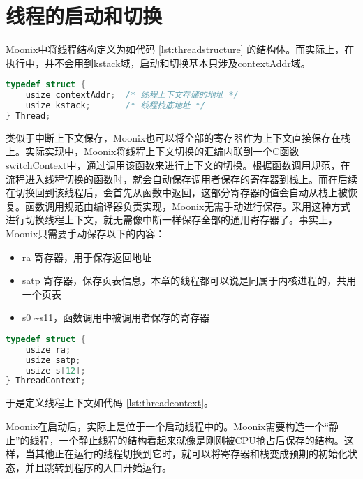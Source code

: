 \section{线程的启动和切换}

Moonix中将线程结构定义为如代码 \ref{lst:threadstructure} 的结构体。而实际上，在执行中，并不会用到kstack域，启动和切换基本只涉及contextAddr域。

\begin{minipage}[c]{0.95\textwidth}
\begin{lstlisting}[language={C}, caption={线程结构定义}, label={lst:threadstructure}]
typedef struct {
	usize contextAddr;  /* 线程上下文存储的地址 */
	usize kstack;       /* 线程栈底地址 */
} Thread;
\end{lstlisting}
\end{minipage}

类似于中断上下文保存，Moonix也可以将全部的寄存器作为上下文直接保存在栈上。实际实现中，Moonix将线程上下文切换的汇编内联到一个C函数switchContext中，通过调用该函数来进行上下文的切换。根据函数调用规范，在流程进入线程切换的函数时，就会自动保存调用者保存的寄存器到栈上。而在后续在切换回到该线程后，会首先从函数中返回，这部分寄存器的值会自动从栈上被恢复。函数调用规范由编译器负责实现，Moonix无需手动进行保存。采用这种方式进行切换线程上下文，就无需像中断一样保存全部的通用寄存器了。事实上，Moonix只需要手动保存以下的内容：

\begin{itemize}
	\item ra 寄存器，用于保存返回地址
	\item satp 寄存器，保存页表信息，本章的线程都可以说是同属于内核进程的，共用一个页表
	\item s0 \textasciitilde s11，函数调用中被调用者保存的寄存器
\end{itemize}

\begin{minipage}[c]{0.95\textwidth}
\begin{lstlisting}[language={C}, caption={线程上下文定义}, label={lst:threadcontext}]
typedef struct {
	usize ra;
	usize satp;
	usize s[12];
} ThreadContext;
\end{lstlisting}
\end{minipage}

于是定义线程上下文如代码 \ref{lst:threadcontext}。

Moonix在启动后，实际上是位于一个启动线程中的。Moonix需要构造一个“静止”的线程，一个静止线程的结构看起来就像是刚刚被CPU抢占后保存的结构。这样，当其他正在运行的线程切换到它时，就可以将寄存器和栈变成预期的初始化状态，并且跳转到程序的入口开始运行。

